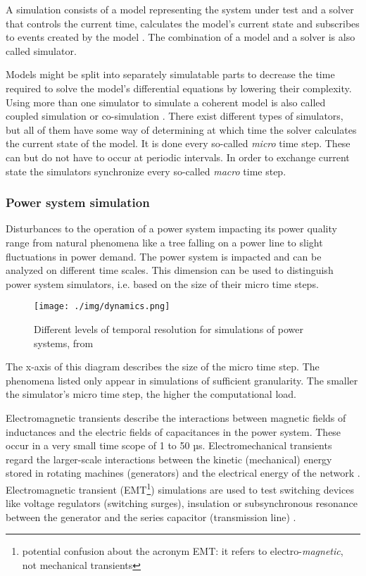 \documentclass[a4paper]{atseminar}
\begin{document}
A simulation consists of a model representing the system under test and a solver that controls the current time, calculates the model's current state and subscribes to events created by the model \cite{palensky2017}. The combination of a model and a solver is also called simulator.

Models might be split into separately simulatable parts to decrease the time required to solve the model's differential equations by lowering their complexity. Using more than one simulator to simulate a coherent model is also called coupled simulation or co-simulation \cite{palensky2017}. There exist different types of simulators, but all of them have some way of determining at which time the solver calculates the current state of the model. It is done every so-called \textit{micro} time step. These can but do not have to occur at periodic intervals. In order to exchange current state the simulators synchronize every so-called \textit{macro} time step.

\subsubsection{Power system simulation}
\label{MH:sec:bg:power-sim}

Disturbances to the operation of a power system impacting its power quality range from natural phenomena like a tree falling on a power line to slight fluctuations in power demand. The power system is impacted and can be analyzed on different time scales. This dimension can be used to distinguish power system simulators, i.e. based on the size of their micro time steps.

\begin{figure}[h]
 \centering
  \texttt{[image: ./img/dynamics.png]}
    \caption{Different levels of temporal resolution for simulations of power systems, from \cite{sauer1998}}
 \label{MH:fig:dynamics}
\end{figure}

The x-axis of this diagram describes the size of the micro time step. The phenomena listed only appear in simulations of sufficient granularity. The smaller the simulator's micro time step, the higher the computational load. 

Electromagnetic transients describe the interactions between magnetic fields of inductances and the electric fields of capacitances in the power system. These occur in a very small time scope of 1 to 50 µs. Electromechanical transients regard the larger-scale interactions between the kinetic (mechanical) energy stored in rotating machines (generators) and the electrical energy of the network \cite{watson2003}.
Electromagnetic transient (EMT\footnote{potential confusion about the acronym EMT: it refers to electro-\textit{magnetic}, not mechanical transients}) simulations are used to test switching devices like voltage regulators (switching surges), insulation or subsynchronous resonance between the generator and the series capacitor (transmission line) \cite{sauer1998}.
\end{document}

